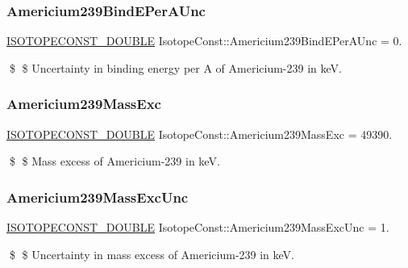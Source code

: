 \subsubsection{\texorpdfstring{Americium239\+Bind\+E\+Per\+A\+Unc}{Americium239BindEPerAUnc}}
{\footnotesize\ttfamily \mbox{\hyperlink{group___isotope_const-_macros_ga8f45a7272ce02c0b4c65c44636ed719a}{I\+S\+O\+T\+O\+P\+E\+C\+O\+N\+S\+T\+\_\+\+D\+O\+U\+B\+LE}} Isotope\+Const\+::\+Americium239\+Bind\+E\+Per\+A\+Unc = 0.}

\$ \$ Uncertainty in binding energy per A of Americium-\/239 in keV. \mbox{\label{group___isotope_const-_americium-_am239_ga58d21d8eea254cf5225a6148b32a3838}} 
\subsubsection{\texorpdfstring{Americium239\+Mass\+Exc}{Americium239MassExc}}
{\footnotesize\ttfamily \mbox{\hyperlink{group___isotope_const-_macros_ga8f45a7272ce02c0b4c65c44636ed719a}{I\+S\+O\+T\+O\+P\+E\+C\+O\+N\+S\+T\+\_\+\+D\+O\+U\+B\+LE}} Isotope\+Const\+::\+Americium239\+Mass\+Exc = 49390.}

\$ \$ Mass excess of Americium-\/239 in keV. \mbox{\label{group___isotope_const-_americium-_am239_ga2c46f31368d7bdced60ab2104feb33f7}} 
\subsubsection{\texorpdfstring{Americium239\+Mass\+Exc\+Unc}{Americium239MassExcUnc}}
{\footnotesize\ttfamily \mbox{\hyperlink{group___isotope_const-_macros_ga8f45a7272ce02c0b4c65c44636ed719a}{I\+S\+O\+T\+O\+P\+E\+C\+O\+N\+S\+T\+\_\+\+D\+O\+U\+B\+LE}} Isotope\+Const\+::\+Americium239\+Mass\+Exc\+Unc = 1.}

\$ \$ Uncertainty in mass excess of Americium-\/239 in keV. \mbox{\label{group___isotope_const-_americium-_am239_ga89205861e821c6c1f30c20907628a39a}} 
